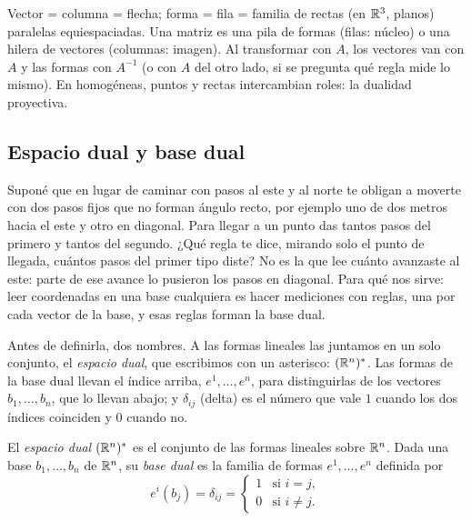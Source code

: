 \begin{resultado}
Vector = columna = flecha; forma = fila = familia de rectas (en \(\mathbb{R}^3\), planos) paralelas
equiespaciadas. Una matriz es una pila de formas (filas: núcleo) o una hilera de vectores
(columnas: imagen). Al transformar con \(A\), los vectores van con \(A\) y las formas con
\(A^{-1}\) (o con \(A\) del otro lado, si se pregunta qué regla mide lo mismo). En homogéneas,
puntos y rectas intercambian roles: la dualidad proyectiva.
\end{resultado}

\subsection{Espacio dual y base dual}\label{sec:base-dual}

Suponé que en lugar de caminar con pasos al este y al norte te obligan a moverte con dos pasos
fijos que no forman ángulo recto, por ejemplo uno de dos metros hacia el este y otro en
diagonal. Para llegar a un punto das tantos pasos del primero y tantos del segundo. ¿Qué regla
te dice, mirando solo el punto de llegada, cuántos pasos del primer tipo diste? No es la que
lee cuánto avanzaste al este: parte de ese avance lo pusieron los pasos en diagonal. Para qué
nos sirve: leer coordenadas en una base cualquiera es hacer mediciones con reglas, una por cada
vector de la base, y esas reglas forman la base dual.

Antes de definirla, dos nombres. A las formas lineales las juntamos en un solo conjunto, el
\emph{espacio dual}, que escribimos con un asterisco: \((\mathbb{R}^n)^{*}\). Las formas de la base
dual llevan el índice arriba, \(e^1,\ldots,e^n\), para distinguirlas de los vectores
\(b_1,\ldots,b_n\), que lo llevan abajo; y \(\delta_{ij}\) (delta) es el número que vale
\(1\) cuando los dos índices coinciden y \(0\) cuando no.

\begin{definicion}\label{def:base-dual}
El \emph{espacio dual} \((\mathbb{R}^n)^{*}\) es el conjunto de las formas lineales sobre \(\mathbb{R}^n\).
Dada una base \(b_1,\ldots,b_n\) de \(\mathbb{R}^n\), su \emph{base dual} es la familia de formas
\(e^1,\ldots,e^n\) definida por
\[
  e^i(b_j)=\delta_{ij}=\begin{cases}1&\text{si } i=j,\\ 0&\text{si } i\neq j.\end{cases}
\]
\end{definicion}

